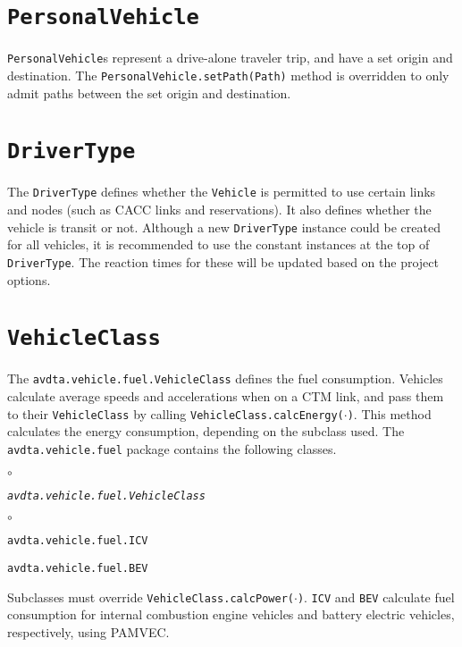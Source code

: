 \section{\texttt{PersonalVehicle}}

\texttt{PersonalVehicle}s represent a drive-alone traveler trip, and have a set origin and destination. The \texttt{PersonalVehicle.setPath(Path)} method is overridden to only admit paths between the set origin and destination.

\section{\texttt{DriverType}}

The \texttt{DriverType} defines whether the \texttt{Vehicle} is permitted to use certain links and nodes (such as CACC links and reservations). It also defines whether the vehicle is transit or not. Although a new \texttt{DriverType} instance could be created for all vehicles, it is recommended to use the constant instances at the top of \texttt{DriverType}. The reaction times for these will be updated based on the project options. 



\section{\texttt{VehicleClass}}

The \texttt{avdta.vehicle.fuel.VehicleClass} defines the fuel consumption. Vehicles calculate average speeds and accelerations when on a CTM link, and pass them to their \texttt{VehicleClass} by calling \texttt{VehicleClass.calcEnergy($\cdot$)}. This method calculates the energy consumption, depending on the subclass used. The \texttt{avdta.vehicle.fuel} package contains the following classes.
\begin{list}{$\circ$}{}
	\item \texttt{\textit{avdta.vehicle.fuel.VehicleClass}}
	\begin{list}{$\circ$}{}
		
		\item \texttt{avdta.vehicle.fuel.ICV}
		\item \texttt{avdta.vehicle.fuel.BEV}
	\end{list}
\end{list}
Subclasses must override \texttt{VehicleClass.calcPower($\cdot$)}.
\texttt{ICV} and \texttt{BEV} calculate fuel consumption for internal combustion engine vehicles and battery electric vehicles, respectively, using PAMVEC\cite{simpson2005parametric}.
